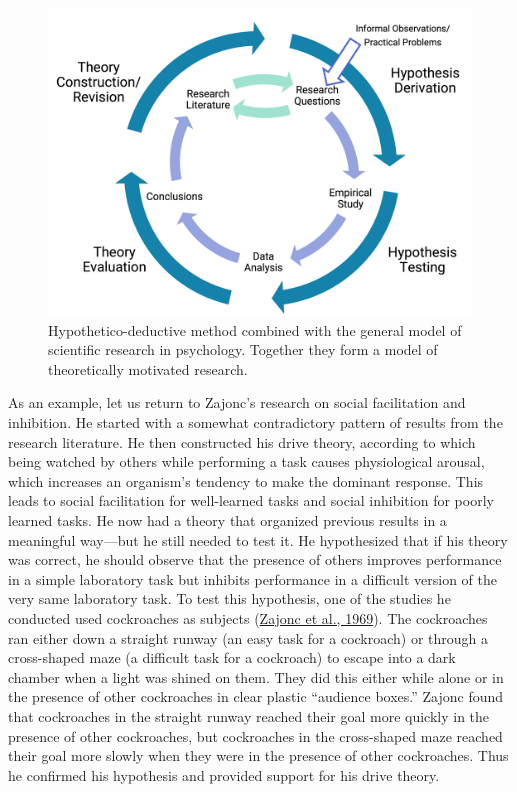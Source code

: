 \documentclass[
]{krantz}
\begin{document}
\begin{figure}

{\centering \includegraphics[width=0.75\linewidth]{images/theory/hypothetico} 

}

\caption{Hypothetico-deductive method combined with the general model of scientific research in psychology. Together they form a model of theoretically motivated research.}\label{fig:hypothetico}
\end{figure}

As an example, let us return to Zajonc's research on social facilitation and inhibition. He started with a somewhat contradictory pattern of results from the research literature. He then constructed his drive theory, according to which being watched by others while performing a task causes physiological arousal, which increases an organism's tendency to make the dominant response. This leads to social facilitation for well-learned tasks and social inhibition for poorly learned tasks. He now had a theory that organized previous results in a meaningful way---but he still needed to test it. He hypothesized that if his theory was correct, he should observe that the presence of others improves performance in a simple laboratory task but inhibits performance in a difficult version of the very same laboratory task. To test this hypothesis, one of the studies he conducted used cockroaches as subjects (\protect\hyperlink{ref-zajonc1969social}{Zajonc et al., 1969}). The cockroaches ran either down a straight runway (an easy task for a cockroach) or through a cross-shaped maze (a difficult task for a cockroach) to escape into a dark chamber when a light was shined on them. They did this either while alone or in the presence of other cockroaches in clear plastic ``audience boxes.'' Zajonc found that cockroaches in the straight runway reached their goal more quickly in the presence of other cockroaches, but cockroaches in the cross-shaped maze reached their goal more slowly when they were in the presence of other cockroaches. Thus he confirmed his hypothesis and provided support for his drive theory.
\end{document}

